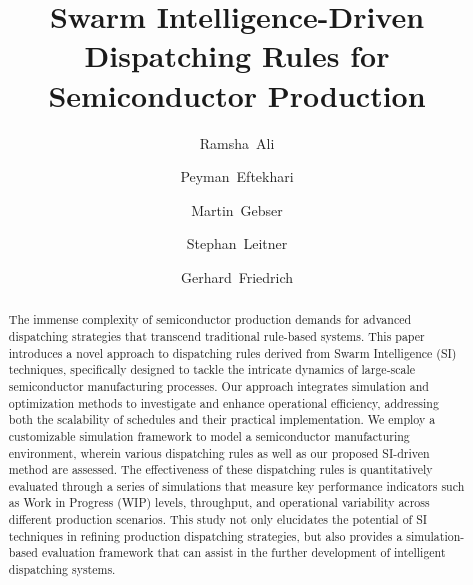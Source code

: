 \documentclass[runningheads]{llncs}
\begin{document}
%
\title{Swarm Intelligence-Driven Dispatching Rules for Semiconductor Production
}
%
%
\author{Ramsha~Ali \and
Peyman~Eftekhari \and
Martin~Gebser \and
Stephan~Leitner \and
Gerhard~Friedrich
}
%
%

%
\maketitle              %
%
\begin{abstract}
The immense complexity of semiconductor production
demands for advanced dispatching strategies that transcend traditional rule-based systems. This paper introduces a novel approach to dispatching rules derived from Swarm Intelligence (SI) techniques, specifically designed to tackle the intricate dynamics of large-scale semiconductor manufacturing processes. Our approach integrates simulation and optimization methods to investigate and enhance operational efficiency, addressing both the scalability of schedules and their practical implementation. We employ a customizable simulation framework to model a semiconductor manufacturing environment, wherein various dispatching rules %
as well as our proposed SI-driven method are assessed.
The effectiveness of these dispatching rules is quantitatively evaluated through a series of simulations that measure key performance indicators such as Work in Progress (WIP) levels, throughput, and operational variability across different production scenarios.
This study not only elucidates the potential of SI techniques in refining production dispatching strategies, but also provides a simulation-based evaluation framework that can assist in the further development of intelligent dispatching systems. 

\end{abstract}
%
%
%
\end{document}
